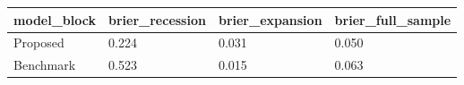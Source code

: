 \begin{tabular}{llll}
\toprule
model_block & brier_recession & brier_expansion & brier_full_sample \\
\midrule
Proposed & 0.224 & 0.031 & 0.050 \\
Benchmark & 0.523 & 0.015 & 0.063 \\
\bottomrule
\end{tabular}
